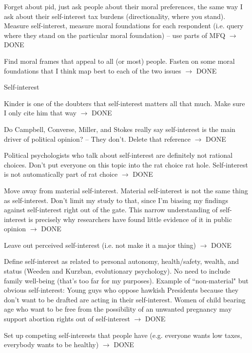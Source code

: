 \documentclass[12pt]{article}
\begin{document}
\begin{coi}
\begin{coi}
				\item Forget about pid, just ask people about their moral preferences, the same way I ask about their self-interest tax burdens (directionality, where you stand). Measure self-interest, measure moral foundations for each respondent (i.e. query where they stand on the particular moral foundation) -- use parts of MFQ $\rightarrow$ DONE
				\item Find moral frames that appeal to all (or most) people. Fasten on some moral foundations that I think map best to each of the two issues $\rightarrow$ DONE
			\end{coi}
		\item Self-interest
			\begin{coi}
				\item Kinder is one of the doubters that self-interest matters all that much. Make sure I only cite him that way $\rightarrow$ DONE
				\item Do Campbell, Converse, Miller, and Stokes really say self-interest is the main driver of political opinion? -- They don't. Delete that reference $\rightarrow$ DONE
				\item Political psychologists who talk about self-interest are definitely not rational choices. Don't put everyone on this topic into the rat choice rat hole. Self-interest is not automatically part of rat choice $\rightarrow$ DONE
				\item Move away from material self-interest. Material self-interest is not the same thing as self-interest. Don't limit my study to that, since I'm biasing my findings against self-interest right out of the gate. This narrow understanding of self-interest is precisely why researchers have found little evidence of it in public opinion $\rightarrow$ DONE
				\item Leave out perceived self-interest (i.e. not make it a major thing) $\rightarrow$ DONE
				\item Define self-interest as related to personal autonomy, health/safety, wealth, and status (Weeden and Kurzban, evolutionary psychology). No need to include family well-being (that's too far for my purposes). Example of ``non-material" but obvious self-interest: Young guys who oppose hawkish Presidents because they don't want to be drafted are acting in their self-interest. Women of child bearing age who want to be free from the possibility of an unwanted pregnancy may support abortion rights out of self-interest $\rightarrow$ DONE
				\item Set up competing self-interests that people have (e.g. everyone wants low taxes, everybody wants to be healthy) $\rightarrow$ DONE

\end{coi}
\end{coi}
\end{document}
